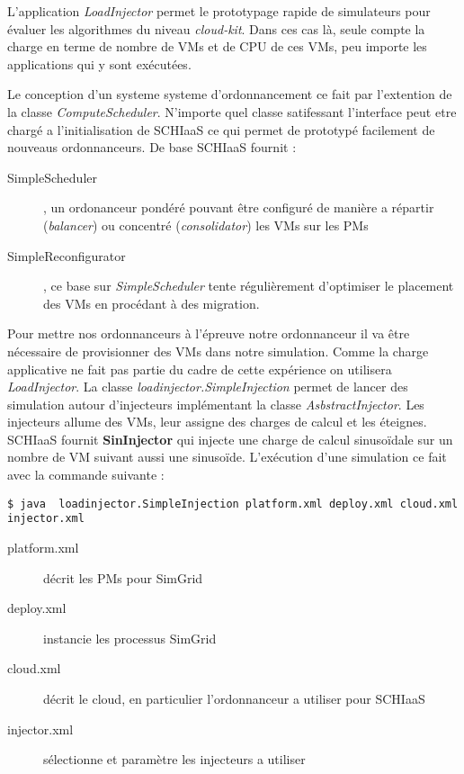 \documentclass[parallelisme]{compas2017}
\begin{document}
L'application \emph{LoadInjector} permet le prototypage rapide de simulateurs
pour évaluer les algorithmes du niveau \textit{cloud-kit}. Dans ces cas là,
seule compte la charge en terme de nombre de VMs et de CPU de ces VMs, peu
importe les applications qui y sont exécutées.

Le conception d'un systeme systeme d'ordonnancement ce fait par l'extention de
la classe \emph{ComputeScheduler}. N'importe quel classe satifessant l'interface
peut etre chargé a l'initialisation de SCHIaaS ce qui permet de prototypé
facilement de nouveaus ordonnanceurs. De base SCHIaaS fournit : 
\begin{description}
	\item[SimpleScheduler], un ordonanceur pondéré pouvant être configuré de
		manière a répartir (\emph{balancer}) ou concentré
		(\emph{consolidator}) les VMs sur les PMs
	\item[SimpleReconfigurator], ce base sur \emph{SimpleScheduler} tente
		régulièrement d'optimiser le placement des VMs en procédant à
		des migration.
\end{description}

Pour mettre nos ordonnanceurs à l'épreuve notre ordonnanceur il va être
nécessaire de provisionner des VMs dans notre simulation. Comme la charge
applicative ne fait pas partie du cadre de cette expérience on utilisera
\emph{LoadInjector}. La classe \emph{loadinjector.SimpleInjection} permet de
lancer des simulation autour d'injecteurs implémentant la classe
\emph{AsbstractInjector}. Les injecteurs allume des VMs, leur assigne des
charges de calcul et les éteignes. SCHIaaS fournit \textbf{SinInjector} qui
injecte une charge de calcul sinusoïdale sur un nombre de VM suivant aussi une
sinusoïde. L'exécution d'une simulation ce fait avec la commande suivante : 
\begin{verbatim}
$ java  loadinjector.SimpleInjection platform.xml deploy.xml cloud.xml
injector.xml
\end{verbatim}
\begin{description}
	\item[platform.xml] décrit les PMs pour SimGrid
	\item[deploy.xml] instancie les processus SimGrid
	\item[cloud.xml] décrit le cloud, en particulier l'ordonnanceur a
		utiliser pour SCHIaaS
	\item[injector.xml] sélectionne et paramètre les injecteurs a utiliser
\end{description}
\end{document}
